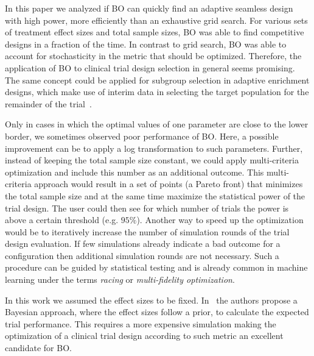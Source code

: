 \documentclass[bimj,fleqn]{w-art}
\theoremstyle{plain}
\theoremstyle{definition}
\begin{document}
In this paper we analyzed if BO can quickly find an adaptive seamless design with high power, more efficiently than an exhaustive grid search.
For various sets of treatment effect sizes and total sample sizes, BO was able to find competitive designs in a fraction of the time.
In contrast to grid search, BO was able to account for stochasticity in the metric that should be optimized.
Therefore, the application of BO to clinical trial design selection in general seems promising. The same concept could be applied for subgroup selection in adaptive enrichment designs, which make use of interim data in selecting the target population for the remainder of the trial~\citep{burnett_adaptive_2020}.

Only in cases in which the optimal values of one parameter are close to the lower border, we sometimes observed poor performance of BO.
Here, a possible improvement can be to apply a log transformation to such parameters. %
Further, instead of keeping the total sample size constant, we could apply multi-criteria optimization and include this number as an additional outcome.
This multi-criteria approach would result in a set of points (a Pareto front) that minimizes the total sample size and at the same time maximize the statistical power of the trial design.
The user could then see for which number of trials the power is above a certain threshold (e.g. $95\%$).
Another way to speed up the optimization would be to iteratively increase the number of simulation rounds of the trial design evaluation. 
If few simulations already indicate a bad outcome for a configuration then additional simulation rounds are not necessary.
Such a procedure can be guided by statistical testing and is already common in machine learning under the terms \emph{racing} or \emph{multi-fidelity optimization}.


In this work we assumed the effect sizes to be fixed. %
In~\citet{stallard_optimal_2009} the authors propose a Bayesian approach, where the effect sizes follow a prior, to calculate the expected trial performance.
This requires a more expensive simulation making the optimization of a clinical trial design according to such metric an excellent candidate for BO.
\end{document}
